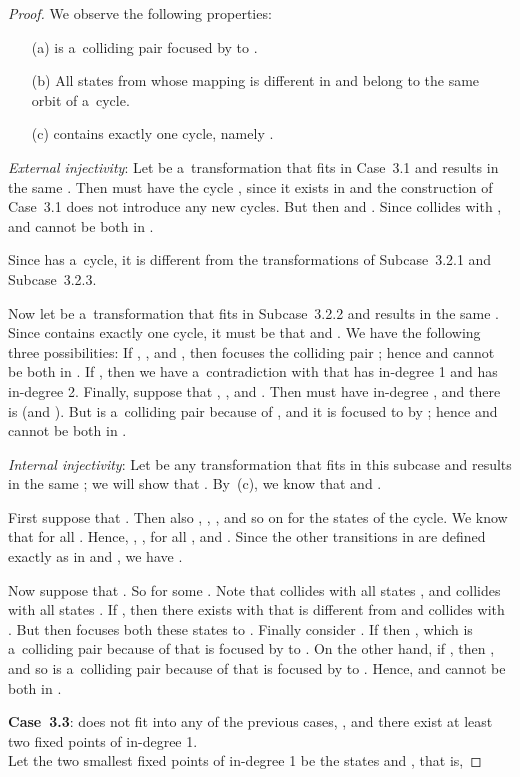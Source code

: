 \documentclass{amsart}
\begin{document}
\begin{proof}
We observe the following properties:
\begin{enumerate}
\item[(a)]  is a~colliding pair focused by  to .

\item[(b)] All states from  whose mapping is different in  and  belong to the same orbit of a~cycle.

\item[(c)]  contains exactly one cycle, namely . 
\end{enumerate}

\textit{External injectivity}:
Let  be a~transformation that fits in Case~3.1 and results in the same .
Then  must have the cycle , since it exists in  and the construction of Case~3.1 does not introduce any new cycles.
But then  and . Since  collides with ,  and  cannot be both in .

Since  has a~cycle, it is different from the transformations of Subcase~3.2.1 and Subcase~3.2.3.

Now let  be a~transformation that fits in Subcase~3.2.2 and results in the same .
Since  contains exactly one cycle, it must be that  and .
We have the following three possibilities:
If , , and , then  focuses the colliding pair ; hence  and  cannot be both in .
If , then we have a~contradiction with that  has in-degree 1 and  has in-degree 2.
Finally, suppose that , , and .
Then  must have in-degree , and there is  (and ).
But  is a~colliding pair because of , and it is focused to  by ; hence  and  cannot be both in .

\textit{Internal injectivity}:
Let  be any transformation that fits in this subcase and results in the same ; we will show that .
By~(c), we know that  and .

First suppose that .
Then also , , , and so on for the states of the cycle.
We know that  for all .
Hence, , ,  for all , and .
Since the other transitions in  are defined exactly as in  and , we have .

Now suppose that .
So  for some .
Note that  collides with all states , and  collides with all states .
If , then there exists  with  that is different from  and collides with .
But then  focuses both these states to .
Finally consider .
If  then , which is a~colliding pair because of  that is focused by  to .
On the other hand, if , then , and so  is a~colliding pair because of  that is focused by  to .
Hence,  and  cannot be both in .

\textbf{Case~3.3}:  does not fit into any of the previous cases, , and there exist at least two fixed points of in-degree 1.\\
Let the two smallest fixed points of in-degree 1 be the states  and , that is,



\end{proof}
\end{document}
